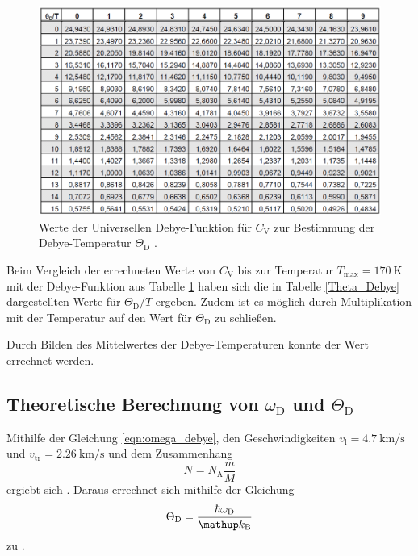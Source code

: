 \begin{figure}[!h]
	\centering
	\includegraphics[width = 14cm]{img/theta.png}
	\caption[]{Werte der Universellen Debye-Funktion für $C_\mathrm{V}$ zur Bestimmung der Debye-Temperatur $\Theta_\mathrm{D}$ \cite{V47}.}
	\label{Cv_global}
\end{figure}

Beim Vergleich der errechneten Werte von $C_\mathrm{V}$ bis zur Temperatur $T_\text{max} = \SI{170}{\kelvin}$ mit der Debye-Funktion aus Tabelle \ref{Cv_global} haben sich die in Tabelle \ref{Theta_Debye} dargestellten Werte für $\Theta_\text{D} / T$ ergeben.
Zudem ist es möglich durch Multiplikation mit der Temperatur auf den Wert für $\Theta_\text{D}$ zu schließen.

Durch Bilden des Mittelwertes der Debye-Temperaturen konnte der Wert  errechnet werden.
\FloatBarrier
\subsection{Theoretische Berechnung von $\omega_\mathrm{D}$ und $\Theta_\mathrm{D}$} %
\label{sub:theoretische_berechnung_von_omega_mathrm}

Mithilfe der Gleichung \eqref{eqn:omega_debye}, den Geschwindigkeiten $v_\text{l}=\SI{4.7}{\kilo\meter\per\second}$ und $v_\text{tr}=\SI{2.26}{\kilo\meter\per\second}$ und dem Zusammenhang
\begin{equation*}
	N = N_\text{A} \frac{m}{M}
\end{equation*}
ergiebt sich .
Daraus errechnet sich mithilfe der Gleichung
\begin{equation*}
	\Theta_\text{D} = \frac{\hbar \omega_\text{D}}{\kb}
\end{equation*}
zu .